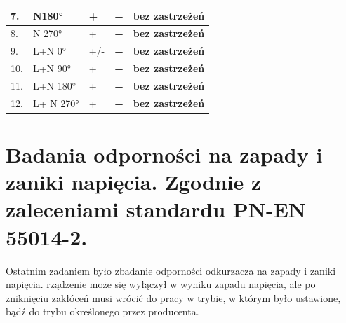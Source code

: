 \documentclass{classrep}
\begin{document}
\begin{table}[H]
\begin{tabular}{|l|l|l|l|l|}
		7.                           & N180°                             & +                                   & \textbf{+}                        & \textbf{bez zastrzeżeń}                                       \\ \hline
		8.                           & N 270°                            & +                                   & \textbf{+}                        & \textbf{bez zastrzeżeń}                                       \\ \hline
		9.                           & L+N 0°                            & +/-                                 & \textbf{+}                        & \textbf{bez zastrzeżeń}                                       \\ \hline
		10.                          & L+N 90°                           & +                                   & \textbf{+}                        & \textbf{bez zastrzeżeń}                                       \\ \hline
		11.                          & L+N 180°                          & +                                   & \textbf{+}                        & \textbf{bez zastrzeżeń}                                       \\ \hline
		12.                          & L+ N 270°                         & +                                   & \textbf{+}                        & \textbf{bez zastrzeżeń}                                       \\ \hline
	\end{tabular}
\end{table}

\section{Badania odporności na zapady i zaniki  napięcia. Zgodnie z zaleceniami standardu PN-EN 55014-2.}

Ostatnim zadaniem było zbadanie odporności odkurzacza na zapady i zaniki napięcia. rządzenie może się wyłączył w wyniku zapadu napięcia, ale po zniknięciu zakłóceń musi wrócić do pracy w trybie, w którym było ustawione, bądź do trybu określonego przez producenta.
\end{document}
